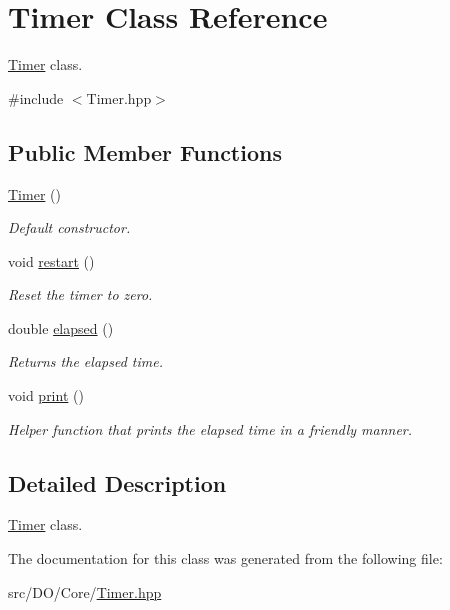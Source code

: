 \hypertarget{class_d_o_1_1_timer}{\section{Timer Class Reference}
\label{class_d_o_1_1_timer}
}


\hyperlink{class_d_o_1_1_timer}{Timer} class.  




{\ttfamily \#include $<$Timer.\-hpp$>$}

\subsection*{Public Member Functions}
\begin{DoxyCompactItemize}
\item 
\hypertarget{class_d_o_1_1_timer_a6a8bc5014802d569f6d01c4f36121a81}{\hyperlink{class_d_o_1_1_timer_a6a8bc5014802d569f6d01c4f36121a81}{Timer} ()}\label{class_d_o_1_1_timer_a6a8bc5014802d569f6d01c4f36121a81}

\begin{DoxyCompactList}\small\item\em Default constructor. \end{DoxyCompactList}\item 
\hypertarget{class_d_o_1_1_timer_a22ee094ca3f45aa4156b97d34fe678bf}{void \hyperlink{class_d_o_1_1_timer_a22ee094ca3f45aa4156b97d34fe678bf}{restart} ()}\label{class_d_o_1_1_timer_a22ee094ca3f45aa4156b97d34fe678bf}

\begin{DoxyCompactList}\small\item\em Reset the timer to zero. \end{DoxyCompactList}\item 
\hypertarget{class_d_o_1_1_timer_afb19d21ecfbd068a2f9c63ae52939df2}{double \hyperlink{class_d_o_1_1_timer_afb19d21ecfbd068a2f9c63ae52939df2}{elapsed} ()}\label{class_d_o_1_1_timer_afb19d21ecfbd068a2f9c63ae52939df2}

\begin{DoxyCompactList}\small\item\em Returns the elapsed time. \end{DoxyCompactList}\item 
\hypertarget{class_d_o_1_1_timer_a388f572c62279f839ee138a9afbdeeb5}{void \hyperlink{class_d_o_1_1_timer_a388f572c62279f839ee138a9afbdeeb5}{print} ()}\label{class_d_o_1_1_timer_a388f572c62279f839ee138a9afbdeeb5}

\begin{DoxyCompactList}\small\item\em Helper function that prints the elapsed time in a friendly manner. \end{DoxyCompactList}\end{DoxyCompactItemize}


\subsection{Detailed Description}
\hyperlink{class_d_o_1_1_timer}{Timer} class. 

The documentation for this class was generated from the following file\-:\begin{DoxyCompactItemize}
\item 
src/\-D\-O/\-Core/\hyperlink{_timer_8hpp}{Timer.\-hpp}\end{DoxyCompactItemize}
